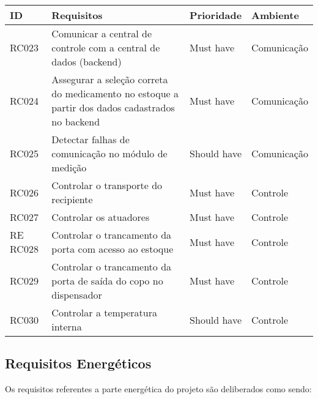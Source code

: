 \begin{table}[H]
    \centering
	\begin{adjustbox}{max width = \textwidth}
        \begin{tabular}{|L{1.5cm}|L{8.5cm}|C{2.5cm}|C{3.5cm}|}
        \hline
        \textbf{ID} & \textbf{Requisitos} & \textbf{Prioridade} & \textbf{Ambiente} \\ \hline
        RC023 & Comunicar a  central de controle com a central de dados (backend) & Must have & Comunicação\\ \hline
        RC024 & Assegurar a seleção correta do medicamento no estoque a partir dos dados cadastrados no backend & Must have & Comunicação\\ \hline
        RC025 & Detectar falhas de comunicação no módulo de medição & Should have & Comunicação\\ \hline
        RC026 & Controlar o transporte do recipiente & Must have & Controle \\ \hline
        RC027 & Controlar os atuadores & Must have & Controle \\ \hline
        RE
        RC028 & Controlar o trancamento da porta com acesso ao estoque & Must have & Controle \\ \hline
        RC029 & Controlar o trancamento da porta de saída do copo no dispensador & Must have & Controle \\ \hline
        RC030 & Controlar a temperatura interna & Should have & Controle \\ \hline
        \end{tabular}
	\end{adjustbox}    
\end{table}

\subsection{Requisitos Energéticos}

Os requisitos referentes a parte energética do projeto são deliberados como sendo:

